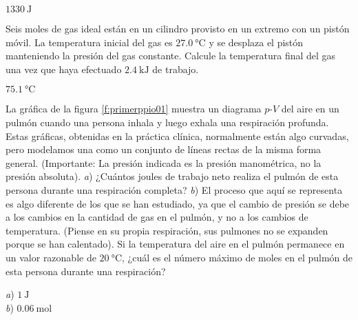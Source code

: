 \begin{Answer}
  $\SI{1330}{\joule}$
\end{Answer}
%
\begin{Exercise}
  {}{}
  Seis moles de gas ideal están en un cilindro provisto en un extremo con un pistón móvil. La temperatura inicial del gas es $\SI{27.0}{\celsius}$ y se desplaza el pistón manteniendo la presión del gas constante. Calcule la temperatura final del gas una vez que haya efectuado $\SI{2.4}{\kilo\joule}$ de trabajo.
\end{Exercise}
\begin{Answer}
  $\SI{75.1}{\celsius}$
\end{Answer}
%
\begin{Exercise}\label{p:primerppio01}
  La gráfica de la figura \ref{f:primerppio01} muestra un diagrama $p$-$V$ del aire en un pulmón cuando una persona inhala y luego exhala una respiración profunda. Estas gráficas, obtenidas en la práctica clínica, normalmente están algo curvadas, pero modelamos una como un conjunto de líneas rectas de la misma forma general. (Importante: La presión indicada es la presión manométrica, no la presión absoluta). \textit{a}) ¿Cuántos joules de trabajo neto realiza el pulmón de esta persona durante una respiración completa? \textit{b}) El proceso que aquí se representa es algo diferente de los que se han estudiado, ya que el cambio de presión se debe a los cambios en la cantidad de gas en el pulmón, y no a los cambios de temperatura. (Piense en su propia respiración, sus pulmones no se expanden porque se han calentado). Si la temperatura del aire en el pulmón permanece en un valor razonable de $\SI{20}{\celsius}$, ¿cuál es el número máximo de moles en el pulmón de esta persona durante una respiración?
\end{Exercise}
\begin{Answer}
	\begin{minipage}[t]{.4\textwidth}
    \textit{a}) $\SI{1}{\joule}$\\ \textit{b}) $\SI{0.06}{\mole}$
  \end{minipage}
\end{Answer}
%
